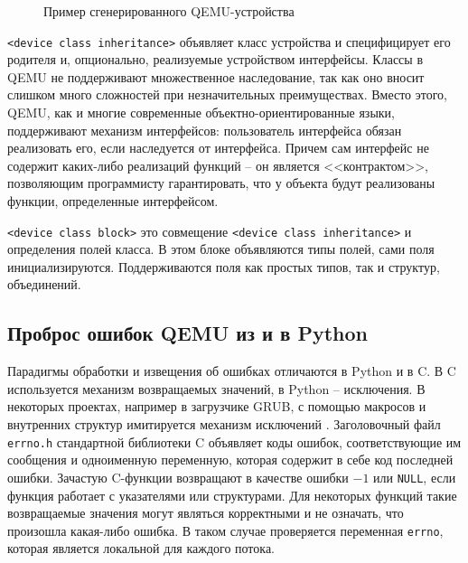 \begin{figure}[!htbp]
    \centering
    \hspace*{-10cm}
    \begin{minipage}{10cm}
        
    \end{minipage}
    \caption{Пример сгенерированного QEMU-устройства}\label{fig:qemu-module-example}
\end{figure}

\texttt{<device class inheritance>} объявляет класс устройства и специфицирует
его родителя и, опционально, реализуемые устройством интерфейсы.
Классы в QEMU не поддерживают множественное наследование, так как
оно вносит слишком много сложностей при незначительных преимуществах.
Вместо этого, QEMU, как и многие современные объектно-ориентированные языки,
поддерживают механизм интерфейсов: пользователь интерфейса обязан реализовать
его, если наследуется от интерфейса. Причем сам интерфейс не содержит каких-либо
реализаций функций -- он является <<контрактом>>, позволяющим программисту гарантировать,
что у объекта будут реализованы функции, определенные интерфейсом.

\texttt{<device class block>} это совмещение \texttt{<device class inheritance>} и определения полей класса. В этом блоке объявляются типы
полей, сами поля инициализируются. Поддерживаются поля как простых типов, так и структур, объединений.

\subsection{Проброс ошибок QEMU из и в Python}\label{sec:ch2/sec1/sub5}
Парадигмы обработки и извещения об ошибках отличаются в Python и в C.
В C используется механизм возвращаемых значений, в Python -- исключения.
В некоторых проектах, например в загрузчике GRUB, с помощью макросов и
внутренних структур имитируется механизм исключений \cite{grub-error-handling}.
Заголовочный файл \texttt{errno.h} стандартной библиотеки C объявляет
коды ошибок, соответствующие им сообщения и одноименную переменную,
которая содержит в себе код последней ошибки.
Зачастую C-функции возвращают в качестве ошибки $-1$ или \texttt{NULL},
если функция работает с указателями или структурами.
Для некоторых функций такие возвращаемые значения могут являться корректными
и не означать, что произошла какая-либо ошибка.
В таком случае проверяется переменная \texttt{errno}, которая
является локальной для каждого потока.

